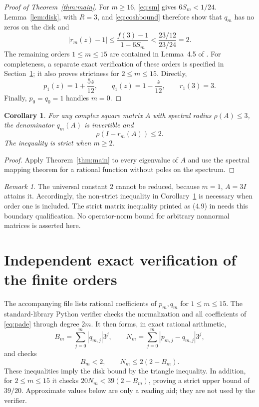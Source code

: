 \documentclass[11pt]{article}
\newtheorem{corollary}[theorem]{Corollary}
\theoremstyle{remark}\newtheorem{remark}[theorem]{Remark}
\begin{document}
\begin{proof}[Proof of Theorem~\ref{thm:main}]
For $m\geq16$, \eqref{eq:sm} gives $6S_m<1/24$. Lemma~\ref{lem:disk}, with $R=3$, and \eqref{eq:coshbound} therefore show that $q_m$ has no zeros on the disk and
\[
|r_m(z)-1|\leq\frac{f(3)-1}{1-6S_m}
<\frac{23/12}{23/24}=2.
\]
The remaining orders $1\leq m\leq15$ are contained in Lemma~4.5 of \cite{NH}. For completeness, a separate exact verification of these orders is specified in Section~\ref{sec:finite}; it also proves strictness for $2\leq m\leq15$. Directly,
\[
p_1(z)=1+\frac{5z}{12},\qquad q_1(z)=1-\frac{z}{12},\qquad r_1(3)=3.
\]
Finally, $p_0=q_0=1$ handles $m=0$.
\end{proof}

\begin{corollary}\label{cor:matrix}
For any complex square matrix $A$ with spectral radius $\rho(A)\leq3$, the denominator $q_m(A)$ is invertible and
\[
\rho(I-r_m(A))\leq2.
\]
The inequality is strict when $m\geq2$.
\end{corollary}
\begin{proof}
Apply Theorem~\ref{thm:main} to every eigenvalue of $A$ and use the spectral mapping theorem for a rational function without poles on the spectrum.
\end{proof}

\begin{remark}
The universal constant $2$ cannot be reduced, because $m=1$, $A=3I$ attains it. Accordingly, the non-strict inequality in Corollary~\ref{cor:matrix} is necessary when order one is included. The strict matrix inequality printed as (4.9) in \cite{NH} needs this boundary qualification. No operator-norm bound for arbitrary nonnormal matrices is asserted here.
\end{remark}

\section{Independent exact verification of the finite orders}\label{sec:finite}
The accompanying file  lists rational coefficients of $p_m,q_m$ for $1\leq m\leq15$. The standard-library Python verifier  checks the normalization and all coefficients of \eqref{eq:pade} through degree $2m$. It then forms, in exact rational arithmetic,
\[
B_m=\sum_{j=0}^m |q_{m,j}|3^j,
\qquad N_m=\sum_{j=0}^m |p_{m,j}-q_{m,j}|3^j,
\]
and checks
\begin{equation}\label{eq:finitechecks}
B_m<2,\qquad N_m\leq2(2-B_m).
\end{equation}
These inequalities imply the disk bound by the triangle inequality. In addition, for $2\leq m\leq15$ it checks $20N_m<39(2-B_m)$, proving a strict upper bound of $39/20$. Approximate values below are only a reading aid; they are not used by the verifier.
\end{document}
